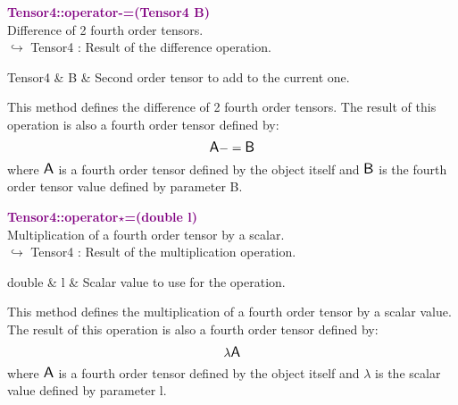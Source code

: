 \textcolor{purple}{\textbf{Tensor4::operator-=(Tensor4 B)}}\label{Tensor4::operator-=(Tensor4 B)}\\
Difference of 2 fourth order tensors.\\ \hspace*{10mm}$\hookrightarrow$ Tensor4 : Result of the difference operation.

\begin{tcolorbox}[width=\textwidth,myArgs,tabularx={ll|R}]
Tensor4 & B & Second order tensor to add to the current one.
\end{tcolorbox}

This method defines the difference of 2 fourth order tensors.
The result of this operation is also a fourth order tensor defined by:
\begin{equation*}
\mbox{\large\ensuremath{\mathsf{A}}} -= \mbox{\large\ensuremath{\mathsf{B}}}
\end{equation*}
where $\mbox{\large\ensuremath{\mathsf{A}}}$ is a fourth order tensor defined by the object itself and $\mbox{\large\ensuremath{\mathsf{B}}}$ is the fourth order tensor value defined by parameter B.

\textcolor{purple}{\textbf{Tensor4::operator$\star$=(double l)}}\label{Tensor4::operator*=(double l)}\\
Multiplication of a fourth order tensor by a scalar.\\ \hspace*{10mm}$\hookrightarrow$ Tensor4 : Result of the multiplication operation.

\begin{tcolorbox}[width=\textwidth,myArgs,tabularx={ll|R}]
double & l & Scalar value to use for the operation.
\end{tcolorbox}

This method defines the multiplication of a fourth order tensor by a scalar value.
The result of this operation is also a fourth order tensor defined by:
\begin{equation*}
\lambda \mbox{\large\ensuremath{\mathsf{A}}}
\end{equation*}
where $\mbox{\large\ensuremath{\mathsf{A}}}$ is a fourth order tensor defined by the object itself and $\lambda$ is the scalar value defined by parameter l.

